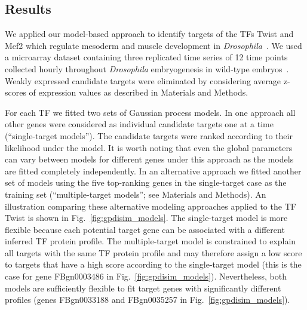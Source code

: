 \documentclass{pnastwo}
\begin{document}
\begin{article}
\section{Results}

We applied our model-based approach to identify targets of the TFs
Twist and Mef2 which regulate mesoderm and muscle development in
\emph{Drosophila}~\cite{Sandmann2007,Zinzen2009}. We used a microarray dataset
containing three replicated time series of 12 time points collected
hourly throughout \emph{Drosophila} embryogenesis in wild-type
embryos~\cite{Tomancak2002}.  Weakly expressed candidate targets were eliminated by 
considering average z-scores of expression values as described in
Materials and Methods.

For each TF we fitted two sets of Gaussian process models. In one
approach all other genes were considered as individual candidate targets one at a
time (``single-target models'').  The candidate targets were ranked
according to their likelihood under the model.  It is worth noting that even the global
parameters can vary between models for different genes under this approach as the models
are fitted completely independently. In an alternative approach we fitted another set of models using the five
top-ranking genes in the single-target case as the training set (``multiple-target models''; see
Materials and Methods).  An illustration comparing these alternative
modeling approaches applied to the TF Twist is shown in Fig.~\ref{fig:gpdisim_models}. The
single-target model is more flexible because each
potential target gene can be associated with a different inferred TF
protein profile. The multiple-target model is constrained to explain
all targets with the same TF protein profile and may therefore assign
a low score to targets that have a high score according to the
single-target model (this is the case for gene FBgn0003486 in
Fig.~\ref{fig:gpdisim_models}). Nevertheless, both models are
sufficiently flexible to fit target genes with significantly different
profiles (genes FBgn0033188 and FBgn0035257 in
Fig.~\ref{fig:gpdisim_models}).


\end{article}
\end{document}
